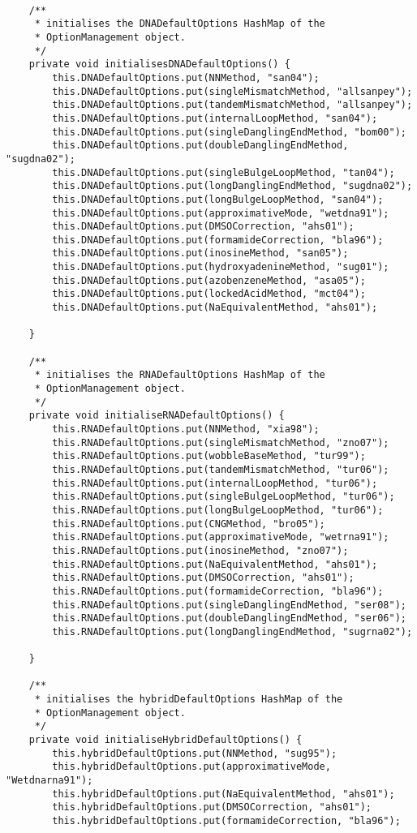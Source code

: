 \documentclass{article}
\begin{document}
\begin{verbatim}

	/**
	 * initialises the DNADefaultOptions HashMap of the 
	 * OptionManagement object.
	 */
	private void initialisesDNADefaultOptions() {
		this.DNADefaultOptions.put(NNMethod, "san04");
		this.DNADefaultOptions.put(singleMismatchMethod, "allsanpey");
		this.DNADefaultOptions.put(tandemMismatchMethod, "allsanpey");
		this.DNADefaultOptions.put(internalLoopMethod, "san04");
		this.DNADefaultOptions.put(singleDanglingEndMethod, "bom00");
		this.DNADefaultOptions.put(doubleDanglingEndMethod, "sugdna02");
		this.DNADefaultOptions.put(singleBulgeLoopMethod, "tan04");
		this.DNADefaultOptions.put(longDanglingEndMethod, "sugdna02");
		this.DNADefaultOptions.put(longBulgeLoopMethod, "san04");
		this.DNADefaultOptions.put(approximativeMode, "wetdna91");
		this.DNADefaultOptions.put(DMSOCorrection, "ahs01");
		this.DNADefaultOptions.put(formamideCorrection, "bla96");
		this.DNADefaultOptions.put(inosineMethod, "san05");
		this.DNADefaultOptions.put(hydroxyadenineMethod, "sug01");
		this.DNADefaultOptions.put(azobenzeneMethod, "asa05");
		this.DNADefaultOptions.put(lockedAcidMethod, "mct04");
		this.DNADefaultOptions.put(NaEquivalentMethod, "ahs01");

	}
	
	/**
	 * initialises the RNADefaultOptions HashMap of the 
	 * OptionManagement object.
	 */
	private void initialiseRNADefaultOptions() {
		this.RNADefaultOptions.put(NNMethod, "xia98");
		this.RNADefaultOptions.put(singleMismatchMethod, "zno07");
		this.RNADefaultOptions.put(wobbleBaseMethod, "tur99");
		this.RNADefaultOptions.put(tandemMismatchMethod, "tur06");
		this.RNADefaultOptions.put(internalLoopMethod, "tur06");
		this.RNADefaultOptions.put(singleBulgeLoopMethod, "tur06");
		this.RNADefaultOptions.put(longBulgeLoopMethod, "tur06");
		this.RNADefaultOptions.put(CNGMethod, "bro05");
		this.RNADefaultOptions.put(approximativeMode, "wetrna91");
		this.RNADefaultOptions.put(inosineMethod, "zno07");
		this.RNADefaultOptions.put(NaEquivalentMethod, "ahs01");
		this.RNADefaultOptions.put(DMSOCorrection, "ahs01");
		this.RNADefaultOptions.put(formamideCorrection, "bla96");
		this.RNADefaultOptions.put(singleDanglingEndMethod, "ser08");
		this.RNADefaultOptions.put(doubleDanglingEndMethod, "ser06");
		this.RNADefaultOptions.put(longDanglingEndMethod, "sugrna02");

	}
	
	/**
	 * initialises the hybridDefaultOptions HashMap of the 
	 * OptionManagement object.
	 */
	private void initialiseHybridDefaultOptions() {
		this.hybridDefaultOptions.put(NNMethod, "sug95");
		this.hybridDefaultOptions.put(approximativeMode, "Wetdnarna91");
		this.hybridDefaultOptions.put(NaEquivalentMethod, "ahs01");
		this.hybridDefaultOptions.put(DMSOCorrection, "ahs01");
		this.hybridDefaultOptions.put(formamideCorrection, "bla96");
		

\end{verbatim}
\end{document}
